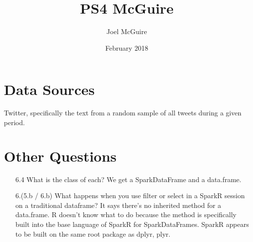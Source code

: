 \documentclass{article}
\title{PS4 McGuire}
\author{Joel McGuire}
\date{February 2018}
\begin{document}
\maketitle

\section{Data Sources}

Twitter, specifically the text from a random sample of all tweets during a given period.

\section{Other Questions}

\begin{enumerate}
    \item[6.4] What is the class of each? We get a SparkDataFrame and a data.frame. 
    \item[ 6.(5.b / 6.b)] What happens when you use filter or select in a SparkR session on a traditional dataframe? It says there's no inherited method for a data.frame. R doesn't know what to do because the method is specifically built into the base language of SparkR for SparkDataFrames. SparkR appears to be built on the same root package as dplyr, plyr.  
\end{enumerate}
\end{document}
